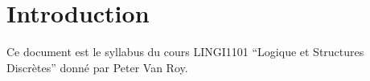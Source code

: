 \section*{Introduction} %

Ce document est le syllabus du cours LINGI1101 ``Logique et Structures Discrètes''
donné par Peter Van Roy.

